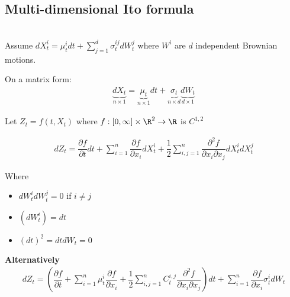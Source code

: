 \subsection{Multi-dimensional Ito formula}\hfill\\
\noindent Assume $dX_t^i = \mu_t^idt +\sum_{j=1}^{d}\sigma_t^{ij}dW_t^j$ where $W^i$ are $d$ independent Brownian motions.\par
\noindent On a matrix form:
\begin{equation*}
  \begin{gathered}
    \underbrace{dX_t}_{n\times 1} = \underbrace{\mu_t}_{n\times 1}dt + \underbrace{\sigma_t}_{n\times d}\underbrace{dW_t}_{d\times 1}
  \end{gathered}
\end{equation*}\par
\noindent Let $Z_t = f(t,X_t)$ where $f:[0,\infty]\times \R^2\to\R$ is $C^{1,2}$
\par\bigskip
\begin{theo}{}
  \begin{equation*}
    \begin{gathered}
      dZ_t = \dfrac{\partial f}{\partial t}dt + \sum_{i=1}^{n}\dfrac{\partial f}{\partial x_i}dX_t^i+\dfrac{1}{2}\sum_{i,j=1}^{n}\dfrac{\partial^2f}{\partial x_i\partial x_j}dX_t^idX_t^j
    \end{gathered}
  \end{equation*}
\end{theo}\par
\noindent Where\par
\begin{itemize}
  \item $dW_t^idW_t^j=0$ if $i\neq j$
  \item $\left(dW_t^i\right) = dt$
  \item $(dt)^2 = dtdW_t = 0$
\end{itemize}
\par\bigskip
\noindent\textbf{Alternatively}
\begin{equation*}
  \begin{gathered}
    dZ_t = \left(\dfrac{\partial f}{\partial t}+\sum_{i=1}^{n}\mu_t^i\dfrac{\partial f}{\partial x_i}+\dfrac{1}{2}\sum_{i,j=1}^{n}C_t^{i,j}\dfrac{\partial^2f}{\partial x_i\partial x_j}\right)dt + \sum_{i=1}^{n}\dfrac{\partial f}{\partial x_i}\sigma_t^idW_t
  \end{gathered}
\end{equation*}\par
